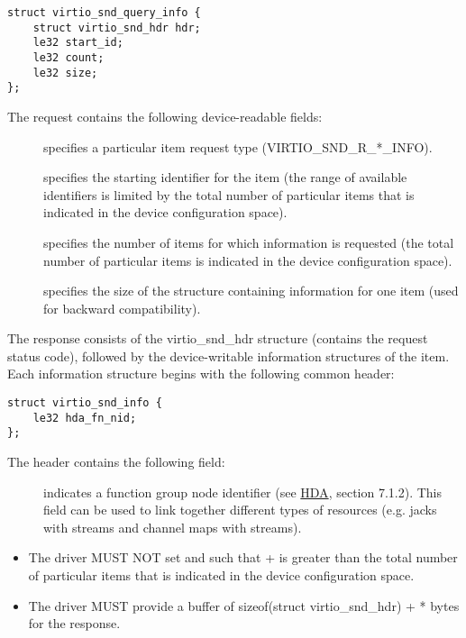 \begin{lstlisting}
struct virtio_snd_query_info {
    struct virtio_snd_hdr hdr;
    le32 start_id;
    le32 count;
    le32 size;
};
\end{lstlisting}

The request contains the following device-readable fields:

\begin{description}
\item[] specifies a particular item request type (VIRTIO_SND_R_*_INFO).
\item[] specifies the starting identifier for the item (the range
of available identifiers is limited by the total number of particular items that
is indicated in the device configuration space).
\item[] specifies the number of items for which information is
requested (the total number of particular items is indicated in the device
configuration space).
\item[] specifies the size of the structure containing information
for one item (used for backward compatibility).
\end{description}

The response consists of the virtio_snd_hdr structure (contains the request
status code), followed by the device-writable information structures of the
item. Each information structure begins with the following common header:

\begin{lstlisting}
struct virtio_snd_info {
    le32 hda_fn_nid;
};
\end{lstlisting}

The header contains the following field:

\begin{description}
\item[] indicates a function group node identifier
(see \hyperref[intro:HDA]{HDA}, section 7.1.2). This field can be used to link
together different types of resources (e.g. jacks with streams and channel maps
with streams).
\end{description}


\begin{itemize}
\item The driver MUST NOT set  and  such that
 +  is greater than the total number of particular
items that is indicated in the device configuration space.
\item The driver MUST provide a buffer of sizeof(struct virtio_snd_hdr) +
 *  bytes for the response.
\end{itemize}

